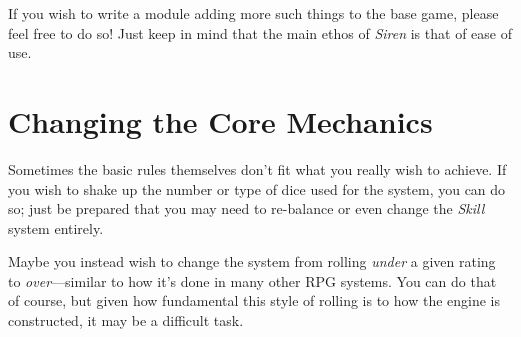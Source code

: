 If you wish to write a module adding more such things to the base game, please feel free to do so! Just keep in mind that the main ethos of \textit{Siren} is that of ease of use.

\section{Changing the Core Mechanics}
Sometimes the basic rules themselves don't fit what you really wish to achieve.
If you wish to shake up the number or type of dice used for the system, you can do so; just be prepared that you may need to re-balance or even change the \textit{Skill} system entirely.

Maybe you instead wish to change the system from rolling \textit{under} a given rating to \textit{over}---similar to how it's done in many other RPG systems.
You can do that of course, but given how fundamental this style of rolling is to how the engine is constructed, it may be a difficult task.